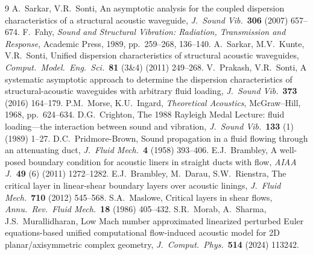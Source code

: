 \documentclass[11pt]{article}
\begin{document}
\begin{thebibliography}{9}
 A.\ Sarkar, V.R.\ Sonti, An asymptotic analysis for the coupled dispersion
characteristics of a structural acoustic waveguide, \emph{J.\ Sound Vib.}\ \textbf{306} (2007) 657--674.
 F.\ Fahy, \emph{Sound and Structural Vibration: Radiation, Transmission and Response},
Academic Press, 1989, pp.\ 259--268, 136--140.
 A.\ Sarkar, M.V.\ Kunte, V.R.\ Sonti, Unified dispersion characteristics of
structural acoustic waveguides, \emph{Comput.\ Model.\ Eng.\ Sci.}\ \textbf{81} (3\&4) (2011) 249--268.
 V.\ Prakash, V.R.\ Sonti, A systematic asymptotic approach to determine the
dispersion characteristics of structural-acoustic waveguides with arbitrary fluid loading,
\emph{J.\ Sound Vib.}\ \textbf{373} (2016) 164--179.
 P.M.\ Morse, K.U.\ Ingard, \emph{Theoretical Acoustics}, McGraw--Hill, 1968,
pp.\ 624--634.
 D.G.\ Crighton, The 1988 Rayleigh Medal Lecture: fluid loading---the interaction
between sound and vibration, \emph{J.\ Sound Vib.}\ \textbf{133} (1) (1989) 1--27.
 D.C.\ Pridmore-Brown, Sound propagation in a fluid flowing through an
attenuating duct, \emph{J.\ Fluid Mech.}\ \textbf{4} (1958) 393--406.
 E.J.\ Brambley, A well-posed boundary condition for acoustic liners in straight
ducts with flow, \emph{AIAA J.}\ \textbf{49} (6) (2011) 1272--1282.
 E.J.\ Brambley, M.\ Darau, S.W.\ Rienstra, The critical layer in linear-shear
boundary layers over acoustic linings, \emph{J.\ Fluid Mech.}\ \textbf{710} (2012) 545--568.
 S.A.\ Maslowe, Critical layers in shear flows, \emph{Annu.\ Rev.\ Fluid Mech.}\
\textbf{18} (1986) 405--432.
 S.R.\ Morab, A.\ Sharma, J.S.\ Murallidharan, Low Mach number approximated linearized
perturbed Euler equations-based unified computational flow-induced acoustic model for 2D
planar/axisymmetric complex geometry, \emph{J.\ Comput.\ Phys.}\ \textbf{514} (2024) 113242.
\end{thebibliography}
\end{document}
